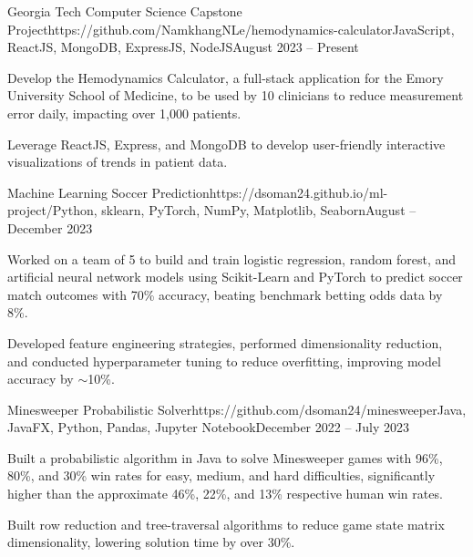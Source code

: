 \documentclass{article}
\begin{document}
\begin{flushleft}

    \vspace{3pt}

    \begin{project}{Georgia Tech Computer Science Capstone Project}{https://github.com/NamkhangNLe/hemodynamics-calculator}{JavaScript, ReactJS, MongoDB, ExpressJS, NodeJS}{August 2023 -- Present}
        \item Develop the Hemodynamics Calculator, a full-stack application for the Emory University School of Medicine, to be used by 10 clinicians to reduce measurement error daily, impacting over 1,000 patients.
        \item Leverage ReactJS, Express, and MongoDB to develop user-friendly interactive visualizations of trends in patient data.
    \end{project}

    \begin{project}{Machine Learning Soccer Prediction}{https://dsoman24.github.io/ml-project/}{Python, sklearn, PyTorch, NumPy, Matplotlib, Seaborn}{August -- December 2023}
        \item Worked on a team of 5 to build and train logistic regression, random forest, and artificial neural network models using Scikit-Learn and PyTorch to predict soccer match outcomes with 70\% accuracy, beating benchmark betting odds data by 8\%.
        \item Developed feature engineering strategies, performed dimensionality reduction, and conducted hyperparameter tuning to reduce overfitting, improving model accuracy by $\sim$10\%.
    \end{project}

    \begin{project}{Minesweeper Probabilistic Solver}{https://github.com/dsoman24/minesweeper}{Java, JavaFX, Python, Pandas, Jupyter Notebook}{December 2022 -- July 2023}
        \item Built a probabilistic algorithm in Java to solve Minesweeper games with 96\%, 80\%, and 30\% win rates for easy, medium, and hard difficulties, significantly higher than the approximate 46\%, 22\%, and 13\% respective human win rates.
        \item Built row reduction and tree-traversal algorithms to reduce game state matrix dimensionality, lowering solution time by over 30\%.
    \end{project}


    \vspace{3pt}
     \\
     \\

\end{flushleft}
\end{document}
